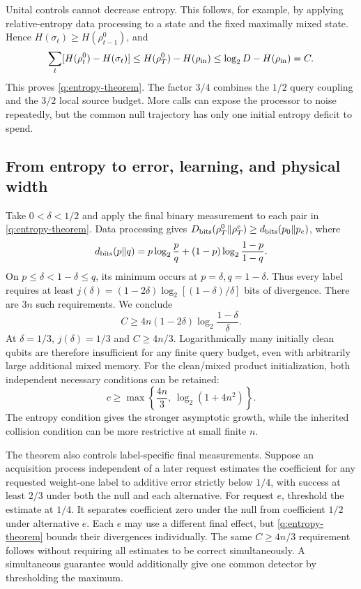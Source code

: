 \documentclass[11pt,a4paper]{article}
\numberwithin{equation}{section}
\theoremstyle{definition}
\theoremstyle{remark}
\begin{document}
Unital controls cannot decrease entropy. This follows, for example, by
applying relative-entropy data processing to a state and the fixed maximally
mixed state. Hence $H(\sigma_t)\geq H(\rho_{t-1}^0)$, and
\[
 \sum_t[H(\rho_t^0)-H(\sigma_t)]
 \leq H(\rho_T^0)-H(\rho_{\rm in})
 \leq\log_2D-H(\rho_{\rm in})=C .
\]
This proves \eqref{q:entropy-theorem}. The factor $3/4$ combines the
$1/2$ query coupling and the $3/2$ local source budget. More calls can expose
the processor to noise repeatedly, but the common null trajectory has only
one initial entropy deficit to spend.

\subsection{From entropy to error, learning, and physical width}

Take $0<\delta<1/2$ and apply the final binary measurement to each pair in
\eqref{q:entropy-theorem}. Data processing gives
$D_{\rm bits}(\rho_T^0\Vert\rho_T^e)\geq d_{\rm bits}(p_0\Vert p_e)$,
where
\[
 d_{\rm bits}(p\Vert q)=
 p\log_2\frac pq+(1-p)\log_2\frac{1-p}{1-q}.
\]
On $p\leq\delta<1-\delta\leq q$, its minimum occurs at
$p=\delta,q=1-\delta$. Thus every label requires at least
$j(\delta)=(1-2\delta)\log_2[(1-\delta)/\delta]$ bits of divergence.
There are $3n$ such requirements. We conclude
\begin{equation}
 \boxed{C\geq4n(1-2\delta)\log_2\frac{1-\delta}{\delta}.}
 \label{q:entropy-error}
\end{equation}
At $\delta=1/3$, $j(\delta)=1/3$ and $C\geq4n/3$.
Logarithmically many initially clean qubits are therefore insufficient for
any finite query budget, even with arbitrarily large additional mixed memory.
For the clean/mixed product initialization, both independent necessary
conditions can be retained:
\[
 c\geq\max\left\{\frac{4n}{3},\,\log_2(1+4n^2)\right\}.
\]
The entropy condition gives the stronger asymptotic growth, while the inherited
collision condition can be more restrictive at small finite $n$.

The theorem also controls label-specific final measurements. Suppose an
acquisition process independent of a later request estimates the coefficient
for any requested weight-one label to additive error strictly below $1/4$,
with success at least $2/3$ under both the null and each alternative.
For request $e$, threshold the estimate at $1/4$. It separates coefficient
zero under the null from coefficient $1/2$ under alternative $e$.
Each $e$ may use a different final effect, but
\eqref{q:entropy-theorem} bounds their divergences individually. The same
$C\geq4n/3$ requirement follows without requiring all estimates to be correct
simultaneously. A simultaneous guarantee would additionally give one common
detector by thresholding the maximum.
\end{document}
